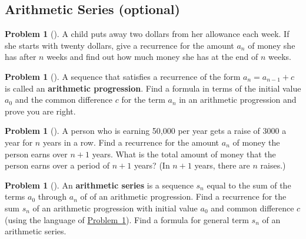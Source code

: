 \documentclass[10pt,]{book}
\newcommand{\terminology}[1]{\textbf{#1}}
\theoremstyle{plain}
\theoremstyle{definition}
\newtheorem{activity}[project]{Problem}
\theoremstyle{definition}
\numberwithin{equation}{chapter}
\begin{document}
\subsection[{Arithmetic Series (optional)}]{Arithmetic Series (optional)}\label{subsection-18}
\begin{activity}[]\marginsymbol[-1em]{} \label{childsaving}
A child puts away two dollars from her allowance each week. If she starts with twenty dollars, give a recurrence for the amount \(a_n\) of money she has after \(n\) weeks and find out how much money she has at the end of \(n\) weeks.%
\end{activity}
\begin{activity}[]\marginsymbol[-1em]{} \label{arithmeticprogression}
A sequence that satisfies a recurrence of the form \(a_n=a_{n-1} +c\) is called an \terminology{arithmetic progression}. Find a formula in terms of the initial value \(a_0\) and the common difference \(c\) for the term \(a_n\) in an arithmetic progression and prove you are right.%
\end{activity}
\begin{activity}[]\marginsymbol[-1em]{} \label{activity-95}
A person who is earning \textdollar{}50,000 per year gets a raise of \textdollar{}3000 a year for \(n\) years in a row. Find a recurrence for the amount \(a_n\) of money the person earns over \(n+1\) years. What is the total amount of money that the person earns over a period of \(n+1\) years? (In \(n+1\) years, there are \(n\) raises.)%
\end{activity}
\begin{activity}[]\marginsymbol[-1em]{} \label{activity-96}
An \terminology{arithmetic series} is a sequence \(s_n\) equal to the sum of the terms \(a_0\) through \(a_n\) of of an arithmetic progression. Find a recurrence for the sum \(s_n\) of an arithmetic progression with initial value \(a_0\) and common difference \(c\) (using the language of \hyperref[arithmeticprogression]{Problem~\ref{arithmeticprogression}}). Find a formula for general term \(s_n\) of an arithmetic series.%
\end{activity}
\typeout{************************************************}
\typeout{************************************************}
\end{document}
